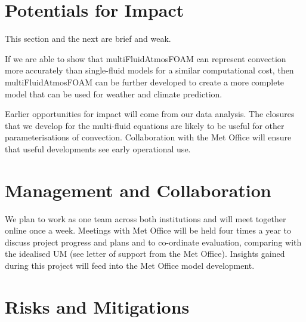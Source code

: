 \documentclass[11pt,a4paper]{article}
\begin{document}


\section{Potentials for Impact}

{\color{red} This section and the next are brief and weak.}

If we are able to show that multiFluidAtmosFOAM can represent convection more accurately than single-fluid models for a similar computational cost, then multiFluidAtmosFOAM can be further developed to create a more complete model that can be used for weather and climate prediction.

Earlier opportunities for impact will come from our data analysis. The closures that we develop for the multi-fluid equations are likely to be useful for other parameterisations of convection. Collaboration with the Met Office will ensure that useful developments see early operational use. 

\section{Management and Collaboration}

We plan to work as one team across both institutions and will meet together online once a week. Meetings with Met Office will be held four times a year to discuss project progress and plans and to co-ordinate evaluation, comparing with the idealised UM (see letter of support from the Met Office). Insights gained during this project will feed into the Met Office model development.

\section{Risks and Mitigations}
\end{document}
